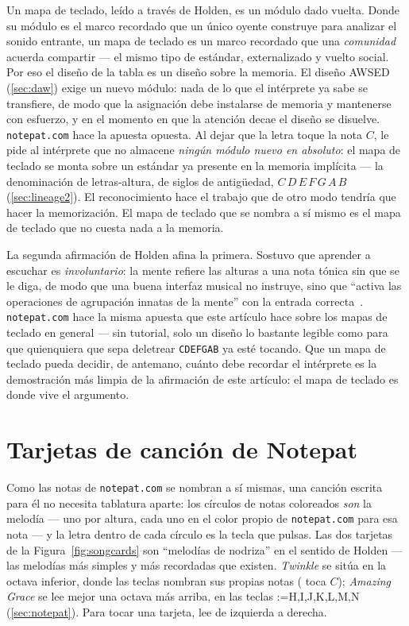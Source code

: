 \documentclass[10pt,letterpaper,twocolumn]{article}
\makeatletter
\DeclareRobustCommand{\key}[1]{\tikz[baseline=(k.base)]{%
 \node[fill=keystroke, rounded corners=1.3pt, inner xsep=2.4pt,
    inner ysep=1.9pt, anchor=base, yshift=-1.2pt] at (0,0)
  {\footnotesize\ttfamily\bfseries\vphantom{A}\phantom{#1}};
 \node[draw=keystroke, line width=0.4pt, fill=keyfill,
    rounded corners=1.3pt, inner xsep=2.4pt, inner ysep=1.9pt,
    anchor=base] (k) at (0,0)
  {\footnotesize\ttfamily\bfseries\vphantom{A}#1};}}
\DeclareRobustCommand{\keys}[1]{{\def\sep{}\@for\kk:=#1\do{\sep\key{\kk}\def\sep{\,}}}}
\makeatother
\begin{document}
Un mapa de teclado, leído a través de Holden, es un módulo dado vuelta. Donde su módulo es el marco recordado que un único oyente construye para analizar el sonido entrante, un mapa de teclado es un marco recordado que una \emph{comunidad} acuerda compartir --- el mismo tipo de estándar, externalizado y vuelto social. Por eso el diseño de la tabla es un diseño sobre la memoria. El diseño AWSED (\textsection\ref{sec:daw}) exige un nuevo módulo: nada de lo que el intérprete ya sabe se transfiere, de modo que la asignación debe instalarse de memoria y mantenerse con esfuerzo, y en el momento en que la atención decae el diseño se disuelve. \texttt{notepat.com} hace la apuesta opuesta. Al dejar que la letra \key{C} toque la nota $C$, le pide al intérprete que no almacene \emph{ningún módulo nuevo en absoluto}: el mapa de teclado se monta sobre un estándar ya presente en la memoria implícita --- la denominación de letras-altura, de siglos de antigüedad, $C\,D\,E\,F\,G\,A\,B$ (\textsection\ref{sec:lineage2}). El reconocimiento hace el trabajo que de otro modo tendría que hacer la memorización. El mapa de teclado que se nombra a sí mismo es el mapa de teclado que no cuesta nada a la memoria.

La segunda afirmación de Holden afina la primera. Sostuvo que aprender a escuchar es \emph{involuntario}: la mente refiere las alturas a una nota tónica sin que se le diga, de modo que una buena interfaz musical no instruye, sino que ``activa las operaciones de agrupación innatas de la mente'' con la entrada correcta~\citep{raz2025}. \texttt{notepat.com} hace la misma apuesta que este artículo hace sobre los mapas de teclado en general --- sin tutorial, solo un diseño lo bastante legible como para que quienquiera que sepa deletrear \texttt{CDEFGAB} ya esté tocando. Que un mapa de teclado pueda decidir, de antemano, cuánto debe recordar el intérprete es la demostración más limpia de la afirmación de este artículo: el mapa de teclado es donde vive el argumento.

\section{Tarjetas de canción de Notepat}
\label{app:songs}

Como las notas de \texttt{notepat.com} se nombran a sí mismas, una canción escrita para él no necesita tablatura aparte: los círculos de notas coloreados \emph{son} la melodía --- uno por altura, cada uno en el color propio de \texttt{notepat.com} para esa nota --- y la letra dentro de cada círculo es la tecla que pulsas. Las dos tarjetas de la Figura~\ref{fig:songcards} son ``melodías de nodriza'' en el sentido de Holden --- las melodías más simples y más recordadas que existen. \emph{Twinkle} se sitúa en la octava inferior, donde las teclas nombran sus propias notas (\key{C} toca $C$); \emph{Amazing Grace} se lee mejor una octava más arriba, en las teclas \keys{H,I,J,K,L,M,N} (\textsection\ref{sec:notepat}). Para tocar una tarjeta, lee de izquierda a derecha.
\end{document}
